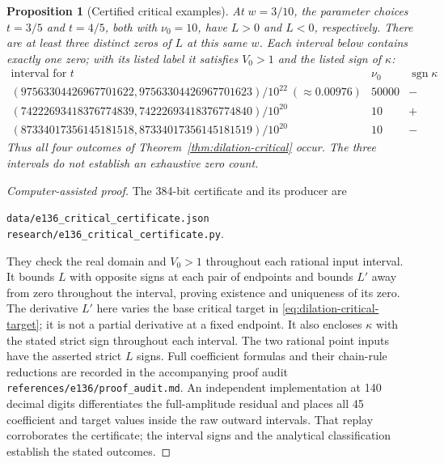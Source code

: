 \documentclass[11pt,a4paper]{article}
\newtheorem{proposition}[theorem]{Proposition}
\theoremstyle{remark}\newtheorem{remark}[theorem]{Remark}
\begin{document}
\begin{proposition}[Certified critical examples]
\label{prop:dilation-critical-examples}
At $w=3/10$, the parameter choices $t=3/5$ and $t=4/5$, both with
$\nu_0=10$, have $L>0$ and $L<0$, respectively. There are at least three
distinct zeros of $L$ at this same $w$. Each interval below contains
exactly one zero; with its listed label it satisfies $V_0>1$ and the
listed sign of $\kappa$:
\[
\begin{array}{c|r|c}
 \text{interval for }t&\nu_0&\operatorname{sgn}\kappa\\ \hline
 (97563304426967701622,97563304426967701623)/10^{22}\ (\approx0.00976)&50000&-\\
 (74222693418376774839,74222693418376774840)/10^{20}&10&+\\
 (87334017356145181518,87334017356145181519)/10^{20}&10&-
\end{array}
\]
Thus all four outcomes of Theorem~\ref{thm:dilation-critical} occur.
The three intervals do not establish an exhaustive zero count.
\end{proposition}
\begin{proof}[Computer-assisted proof]
The 384-bit certificate and its producer are
\begin{center}\small
\nolinkurl{data/e136_critical_certificate.json}\\
\nolinkurl{research/e136_critical_certificate.py}.
\end{center}
They check the real domain and $V_0>1$ throughout each rational input interval.
It bounds $L$ with opposite signs at each pair of endpoints and bounds
$L'$ away from zero throughout the interval, proving existence and
uniqueness of its zero. The derivative $L'$ here varies the base critical
target in \eqref{eq:dilation-critical-target}; it is not a partial
derivative at a fixed endpoint. It also encloses $\kappa$ with the stated
strict sign throughout each interval. The two rational point inputs
have the asserted strict $L$ signs. Full coefficient formulas and their
chain-rule reductions are recorded in the accompanying proof audit
\nolinkurl{references/e136/proof_audit.md}. An independent implementation
at 140 decimal digits differentiates the full-amplitude residual and
places all 45 coefficient and target values inside the raw outward
intervals. That replay corroborates the certificate; the interval signs
and the analytical classification establish the stated outcomes.
\end{proof}
\end{document}
